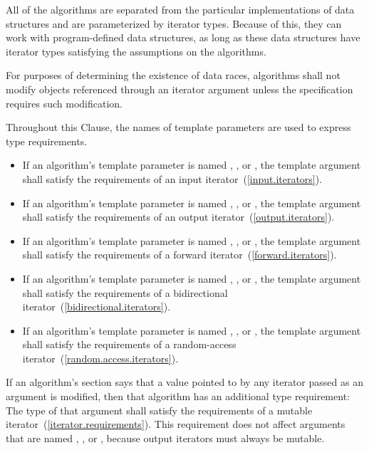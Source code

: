 \pnum
All of the algorithms are separated from the particular implementations of data structures and are
parameterized by iterator types.
Because of this, they can work with program-defined data structures, as long
as these data structures have iterator types satisfying the assumptions on the algorithms.

\pnum
For purposes of determining the existence of data races, algorithms shall
not modify objects referenced through an iterator argument unless the
specification requires such modification.

\pnum
Throughout this Clause, the names of template parameters
are used to express type requirements.
\begin{itemize}
\item
If an algorithm's template parameter is named
,
,
or
,
the template argument shall satisfy the
requirements of an input iterator~(\ref{input.iterators}).
\item
If an algorithm's template parameter is named
,
,
or
,
the template argument shall satisfy the requirements
of an output iterator~(\ref{output.iterators}).
\item
If an algorithm's template parameter is named
,
,
or
,
the template argument shall satisfy the requirements
of a forward iterator~(\ref{forward.iterators}).
\item
If an algorithm's template parameter is named
,
,
or
,
the template argument shall satisfy the requirements
of a bidirectional iterator~(\ref{bidirectional.iterators}).
\item
If an algorithm's template parameter is named
,
,
or
,
the template argument shall satisfy the requirements
of a random-access iterator~(\ref{random.access.iterators}).
\end{itemize}

\pnum
If an algorithm's
section says that a value pointed to by any iterator passed
as an argument is modified, then that algorithm has an additional
type requirement:
The type of that argument shall satisfy the requirements
of a mutable iterator~(\ref{iterator.requirements}).
\enternote
This requirement does not affect arguments that are named
,
,
or
,
because output iterators must always be mutable.
\exitnote

